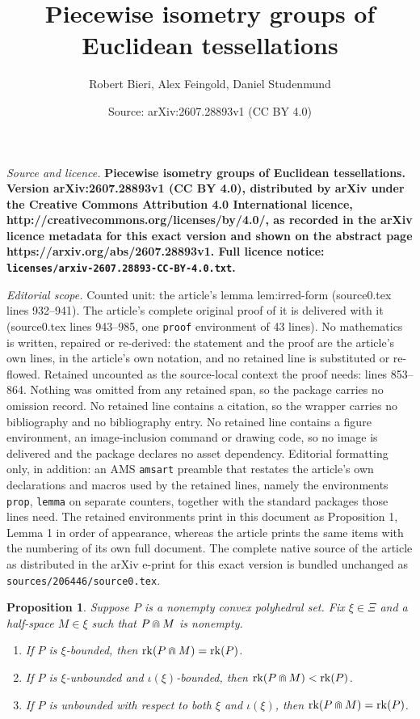 \documentclass[10pt,a4paper]{amsart}
\title{\bf{Piecewise isometry groups of Euclidean tessellations}}
\author{Robert Bieri, Alex Feingold, Daniel Studenmund}
\date{Source: arXiv:2607.28893v1 (CC BY 4.0)}
\newtheorem{prop}{Proposition}
\DeclareMathOperator{\rk}{rk}
\begin{document}
\maketitle

\noindent\emph{Source and licence.} \bf{Piecewise isometry groups of Euclidean tessellations}. Version arXiv:2607.28893v1 (CC BY 4.0), distributed by arXiv under the Creative Commons Attribution 4.0 International licence, http://creativecommons.org/licenses/by/4.0/, as recorded in the arXiv licence metadata for this exact version and shown on the abstract page https://arxiv.org/abs/2607.28893v1. Full licence notice: \texttt{licenses/arxiv-2607.28893-CC-BY-4.0.txt}.\par\smallskip

\noindent\textit{Editorial scope.} Counted unit: the article's lemma lem:irred-form (source0.tex lines 932--941). The article's complete original proof of it is delivered with it (source0.tex lines 943--985, one \texttt{proof} environment of 43 lines). No mathematics is written, repaired or re-derived: the statement and the proof are the article's own lines, in the article's own notation, and no retained line is substituted or re-flowed.  Retained uncounted as the source-local context the proof needs: lines 853--864.  Nothing was omitted from any retained span, so the package carries no omission record.  No retained line contains a citation, so the wrapper carries no bibliography and no bibliography entry.  No retained line contains a figure environment, an image-inclusion command or drawing code, so no image is delivered and the package declares no asset dependency.  Editorial formatting only, in addition: an AMS \texttt{amsart} preamble that restates the article's own declarations and macros used by the retained lines, namely the environments \texttt{prop}, \texttt{lemma} on separate counters, together with the standard packages those lines need.  The retained environments print in this document as Proposition 1, Lemma 1 in order of appearance, whereas the article prints the same items with the numbering of its own full document.  The complete native source of the article as distributed in the arXiv e-print for this exact version is bundled unchanged as \texttt{sources/206446/source0.tex}.
\begin{prop} \label{prop:piececut} Suppose $P$ is a nonempty
  convex polyhedral set.  Fix $\xi\in \Xi$ and a half-space
  $M\in \xi$ such that $P\doublecap M$ is nonempty.
  \begin{enumerate}
  \item \label{unboundcutpart} If $P$ is $\xi$-bounded, then  
    $\rk(P\doublecap M) = \rk(P)$.
  \item \label{boundcutpart} If $P$ is $\xi$-unbounded and 
    $\iota(\xi)$-bounded, then  $\rk(P\doublecap M) < \rk(P)$.
  \item \label{doubleunboundcutpart} If $P$ is unbounded with respect
    to both $\xi$ and $\iota(\xi)$, then $\rk(P\doublecap M) = \rk(P)$.
  \end{enumerate}
\end{prop}
\end{document}
